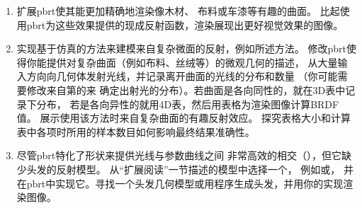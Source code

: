 \begin{enumerate}
          \footnote{必须用面光源而不是点光源或定向光源，因为镜像曲面中看到的这些光源有细微差异。
              对于pbrt所用的光传输算法，镜像曲面中的无穷小点光源是永远不可见的。
              这是光线追踪渲染器的典型局限性且实践中通常不会带来麻烦。}。
          把相机置于场景中使得每个像素区域内都有非常大量的微面，
          用成百上千的像素样本来渲染该场景图像。比较使用平坦曲面与基于微面的BRDF模型的结果。
          如果你尽量调整微面BRDF参数，你能让这两种方法匹配得多好？
          你能否构造例子，使得用正确的微面渲染的图像能因为更好地建模了掩模、
          自遮挡以及微面间的互反射效应而十分明显地更加逼真？
    \item \circlethree 扩展pbrt使其能更加精确地渲染像木材\citep{10.1145/1186822.1073254}、
          布料\citep{2003_sattler_egsr}或车漆\citep{guenther:05:carpaint}等有趣的曲面。
          比起使用pbrt为这些效果提供的现成反射函数，渲染展现出更好视觉效果的图像。
    \item \circlethree 实现基于仿真的方法来建模来自复杂微面的反射，例如\citet{10.1145/133994.134075}所述方法。
          修改pbrt使得你能提供对复杂曲面（例如布料、丝绒等）的微观几何的描述，
          从大量输入方向向几何体发射光线，并记录离开曲面的光线的分布和数量
          （你可能需要修改来自第的来
          确定出射光的分布）。若曲面是各向同性的，就在3D表中记录下分布，
          若是各向异性的就用4D表，然后用表格为渲染图像计算BRDF值。
          展示使用该方法时来自复杂曲面的有趣反射效应。
          探究表格大小和计算表中各项时所用的样本数目如何影响最终结果准确性。
    \item \circletwo 尽管pbrt特化了形状来提供光线与参数曲线之间
          非常高效的相交（），但它缺少头发的反射模型。
          从“扩展阅读”一节描述的模型中选择一个，
          例如\citet{10.1145/882262.882345}或\citet{10.1111/j.1467-8659.2011.01976.x}，
          并在pbrt中实现它。寻找一个头发几何模型或用程序生成头发，并用你的实现渲染图像。
\end{enumerate}
